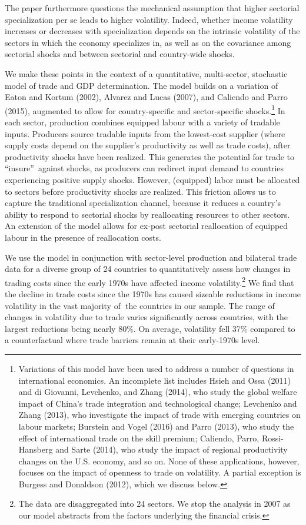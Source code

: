 \documentclass[12pt]{article}
\begin{document}
The paper furthermore questions the mechanical assumption that higher
sectorial specialization per se leads to higher volatility. Indeed, whether
income volatility increases or decreases with specialization depends on the
intrinsic volatility of the sectors in which the economy specializes in, as
well as on the covariance among sectorial shocks and between sectorial and
country-wide shocks.

We make these points in the context of a quantitative, multi-sector,
stochastic model of trade and GDP determination. The model builds on a
variation of Eaton and Kortum (2002), Alvarez and Lucas (2007), and Caliendo
and Parro (2015), augmented to allow for country-specific and
sector-specific shocks.\footnote{\label{FTlit}Variations of this model have
been used to address a number of questions in international economics. An
incomplete list includes Hsieh and Ossa (2011) and di Giovanni, Levchenko,
and Zhang (2014), who study the global welfare impact of China's trade
integration and technological change; Levchenko and Zhang (2013), who
investigate the impact of trade with emerging countries on labour markets;
Burstein and Vogel (2016) and Parro (2013), who study the effect of
international trade on the skill premium; Caliendo, Parro, Rossi-Hansberg
and Sarte (2014), who study the impact of regional productivity changes on
the U.S. economy, and so on. None of these applications, however, focuses on
the impact of openness to trade on volatility. A partial exception is
Burgess and Donaldson (2012), which we discuss below.} In each sector,
production combines equipped labour with a variety of tradable inputs.
Producers source tradable inputs from the lowest-cost supplier (where supply
costs depend on the supplier's productivity as well as trade costs), after
productivity shocks have been realized. This generates the potential for
trade to \textquotedblleft insure\textquotedblright\ against shocks, as
producers can redirect input demand to countries experiencing positive
supply shocks. However, (equipped) labor must be allocated to sectors before
productivity shocks are realized. This friction allows us to capture the
traditional specialization channel, because it reduces a country's ability
to respond to sectorial shocks by reallocating resources to other sectors.
An extension of the model allows for ex-post sectorial reallocation of
equipped labour in the presence of reallocation costs.

We use the model in conjunction with sector-level production and bilateral
trade data for a diverse group of 24 countries to quantitatively assess how
changes in trading costs since the early 1970s have affected income
volatility.\footnote{%
The data are disaggregated into 24 sectors. We stop the analysis in 2007 as
our model abstracts from the factors underlying the financial crisis.} We
find that the decline in trade costs since the 1970s has caused sizeable
reductions in income volatility in the vast majority of\textbf{\ }the
countries in our sample. The range of changes in volatility due to trade
varies significantly across countries, with the largest reductions being
nearly 80\%. On average, volatility fell 37\% compared to a counterfactual
where trade barriers remain at their early-1970s level.
\end{document}
